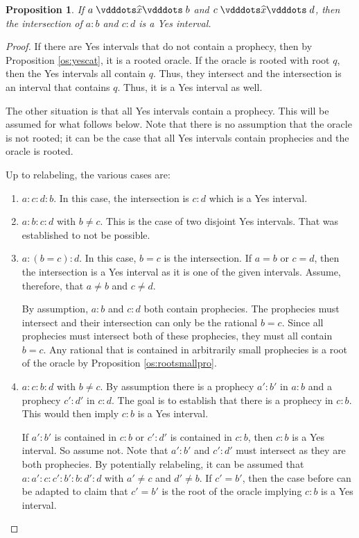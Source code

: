 \documentclass[12pt]{article}
\newtheorem{proposition}{Proposition}[section]
\begin{document}
   
\begin{proposition}
    If $ a\xora b$ and $c \xora d$, then the intersection of $a:b$ and $c:d$ is a Yes interval. 
\end{proposition}

\begin{proof}
    If there are Yes intervals that do not contain a prophecy, then by Proposition \ref{os:yescat}, it is a rooted oracle. If the oracle is rooted with root $q$, then the Yes intervals all contain $q$. Thus, they intersect and the intersection is an interval that contains $q$. Thus, it is a Yes interval as well. 

    The other situation is that all Yes intervals contain a prophecy. This will be assumed for what follows below. Note that there is no assumption that the oracle is not rooted; it can be the case that all Yes intervals contain prophecies and  the oracle is rooted. 

    Up to relabeling, the various cases are: 
    \begin{enumerate}
        \item $a:c:d:b$. In this case, the intersection is $c:d$ which is a Yes interval. 
        \item $a:b:c:d$ with $b \neq c$. This is the case of two disjoint Yes intervals. That was established to not be possible. 


        \item $a:(b=c):d$. In this case, $b=c$ is the intersection.  If $a=b$ or $c=d$, then the intersection is a Yes interval as it is one of the given intervals. Assume, therefore, that $a \neq b$ and $c \neq d$. 
        
        By assumption, $a:b$ and $c:d$ both contain prophecies. The prophecies must intersect and their intersection can only be the rational $b=c$. Since all prophecies must intersect both of these prophecies, they must all contain $b=c$. Any rational that is  contained in arbitrarily small prophecies is a root of the oracle by Proposition \ref{os:rootsmallpro}.
        
        \item $a:c:b:d$ with $b \neq c$. By assumption there is a prophecy $a':b'$ in $a:b$ and a prophecy $c':d'$ in $c:d$. The goal is to establish that there is a prophecy in $c:b$. This would then imply $c:b$ is a Yes interval. 
        
        If $a':b'$ is contained in $c:b$ or $c':d'$ is contained in $c:b$, then $c:b$ is a Yes interval. So assume not. Note that $a':b'$ and $c':d'$ must intersect as they are both prophecies. By potentially relabeling, it can be assumed that $a:a':c:c':b':b:d':d$ with $a'\neq c$ and $d' \neq b$. If $c'=b'$, then the case before can be adapted to claim that $c'=b'$ is the root of the oracle implying $c:b$ is a Yes interval. 


\end{enumerate}
\end{proof}
\end{document}
